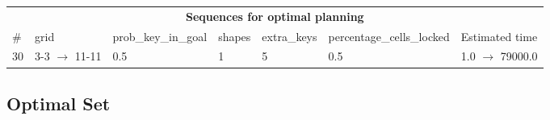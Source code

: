 \documentclass{article}
\begin{document}
                            \begin{center}
                            \begin{tabular}{l|l|l|l|l|l|l}
                            \multicolumn{7}{c}{\bf \large Sequences for optimal planning}\\
                            \# & grid & prob\_key\_in\_goal & shapes & extra\_keys & percentage\_cells\_locked & Estimated time\\\midrule
                            30&3-3 $\rightarrow$ 11-11&0.5&1&5&0.5&1.0 $\rightarrow$ 79000.0
                            \end{tabular}
                            \end{center}
                    
                                \subsection*{Optimal Set}
                                
\end{document}
